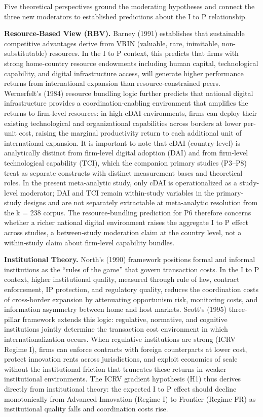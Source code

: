 \documentclass[
  12pt,a4paper]{article}
\begin{document}
Five theoretical perspectives ground the moderating hypotheses and
connect the three new moderators to established predictions about the I
to P relationship.

\textbf{Resource-Based View (RBV).} Barney (1991) establishes that
sustainable competitive advantages derive from VRIN (valuable, rare,
inimitable, non-substitutable) resources. In the I to P context, this
predicts that firms with strong home-country resource endowments
including human capital, technological capability, and digital
infrastructure access, will generate higher performance returns from
international expansion than resource-constrained peers. Wernerfelt's
(1984) resource bundling logic further predicts that national digital
infrastructure provides a coordination-enabling environment that
amplifies the returns to firm-level resources: in high-cDAI
environments, firms can deploy their existing technological and
organizational capabilities across borders at lower per-unit cost,
raising the marginal productivity return to each additional unit of
international expansion. It is important to note that cDAI
(country-level) is analytically distinct from firm-level digital
adoption (DAI) and from firm-level technological capability (TCI), which
the companion primary studies (P3--P8) treat as separate constructs with
distinct measurement bases and theoretical roles. In the present
meta-analytic study, only cDAI is operationalized as a study-level
moderator; DAI and TCI remain within-study variables in the
primary-study designs and are not separately extractable at
meta-analytic resolution from the k = 238 corpus. The resource-bundling
prediction for P6 therefore concerns whether a richer national digital
environment raises the aggregate I to P effect across studies, a
between-study moderation claim at the country level, not a within-study
claim about firm-level capability bundles.

\textbf{Institutional Theory.} North's (1990) framework positions formal
and informal institutions as the ``rules of the game'' that govern
transaction costs. In the I to P context, higher institutional quality,
measured through rule of law, contract enforcement, IP protection, and
regulatory quality, reduces the coordination costs of cross-border
expansion by attenuating opportunism risk, monitoring costs, and
information asymmetry between home and host markets. Scott's (1995)
three-pillar framework extends this logic: regulative, normative, and
cognitive institutions jointly determine the transaction cost
environment in which internationalization occurs. When regulative
institutions are strong (ICRV Regime I), firms can enforce contracts
with foreign counterparts at lower cost, protect innovation rents across
jurisdictions, and exploit economies of scale without the institutional
friction that truncates these returns in weaker institutional
environments. The ICRV gradient hypothesis (H1) thus derives directly
from institutional theory: the expected I to P effect should decline
monotonically from Advanced-Innovation (Regime I) to Frontier (Regime
FR) as institutional quality falls and coordination costs rise.
\end{document}
